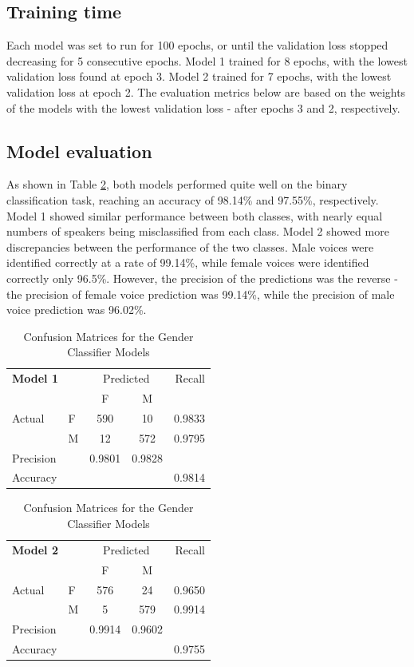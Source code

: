 \documentclass[11pt, letterpaper]{article}
\begin{document}
\subsection{Training time}

Each model was set to run for 100 epochs, or until the validation loss stopped decreasing for 5 consecutive epochs. Model 1 trained for 8 epochs, with the lowest validation loss found at epoch 3. Model 2 trained for 7 epochs, with the lowest validation loss at epoch 2. The evaluation metrics below are based on the weights of the models with the lowest validation loss - after epochs 3 and 2, respectively.

\subsection{Model evaluation}

As shown in Table \ref{tab:GenConfusion}, both models performed quite well on the binary classification task, reaching an accuracy of 98.14\% and 97.55\%, respectively. Model 1 showed similar performance between both classes, with nearly equal numbers of speakers being misclassified from each class. Model 2 showed more discrepancies between the performance of the two classes. Male voices were identified correctly at a rate of 99.14\%, while female voices were identified correctly only 96.5\%. However, the precision of the predictions was the reverse - the precision of female voice prediction was 99.14\%, while the precision of male voice prediction was 96.02\%.

\begin{table}[h]
\begin{center}
\caption{Confusion Matrices for the Gender Classifier Models}
\begin{tabular}{l l | c c r }
\multicolumn{2}{l}{\textbf{Model 1}} & \multicolumn{2}{c}{Predicted} & Recall \\
& & F & M &  \\ 
\cline{2-5}
Actual & F & 590 &  10 & 0.9833 \\
& M & 12 & 572 & 0.9795 \\  \hline
Precision&  & 0.9801 & 0.9828 \\ 
Accuracy & & &  & 0.9814 \\
\end{tabular}
\begin{tabular}{l l | c c r }
\multicolumn{2}{l}{\textbf{Model 2}} & \multicolumn{2}{c}{Predicted} & Recall \\
& & F& M &  \\ 
\cline{2-5}
Actual & F & 576 &  24 & 0.9650 \\
& M & 5 & 579 & 0.9914 \\  \hline
Precision&  & 0.9914 & 0.9602 \\ 
Accuracy & & &  & 0.9755 \\
\end{tabular}
\label{tab:GenConfusion}
\end{center}
\end{table} 
\end{document}
